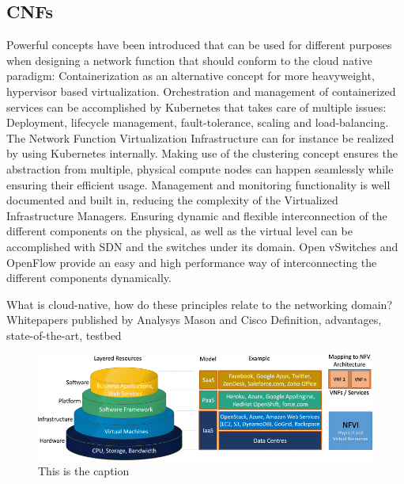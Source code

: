 \subsection{CNFs}
Powerful concepts have been introduced that can be used for different purposes when designing a network function that should conform to the cloud native paradigm: Containerization as an alternative concept for more heavyweight, hypervisor based virtualization. Orchestration and management of containerized services can be accomplished by Kubernetes that takes care of multiple issues: Deployment, lifecycle management, fault-tolerance, scaling and load-balancing. The Network Function Virtualization Infrastructure can for instance be realized by using Kubernetes internally. Making use of the clustering concept ensures the abstraction from multiple, physical compute nodes can happen seamlessly while ensuring their efficient usage. Management and monitoring functionality is well documented and built in, reducing the complexity of the Virtualized Infrastructure Managers. Ensuring dynamic and flexible interconnection of the different components on the physical, as well as the virtual level can be accomplished with SDN and the switches under its domain. Open vSwitches and OpenFlow provide an easy and high performance way of interconnecting the different components dynamically. 



What is cloud-native, how do these principles relate to  the networking domain? Whitepapers published by Analysys Mason \cite{evolutionnfv} and Cisco \cite{CNF}
Definition, advantages, state-of-the-art, testbed 



\begin{figure}[h]
	\centering
	\includegraphics[width=1\linewidth]{images/arch.png}
	\caption{This is the caption \cite{mijumbi2016network}}
	\label{img:arch}
\end{figure}

